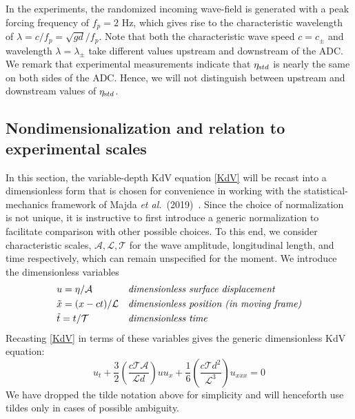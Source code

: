 \documentclass[11pt]{article}
\newcommand{\freqp}{f_p}
\newcommand{\etastd}{\eta_{\text std}}
\newcommand{\depth}{d}
\newcommand{\lam}{\lambda}
\newcommand{\lamupdn}{\lam_{\pm}}
\newcommand{\ampscale}{\mathcal{A}}
\newcommand{\lengthscale}{\mathcal{L}}
\newcommand{\timescale}{\mathcal{T}}
\newcommand{\maetal}{Majda {\it et al.}~(2019)~}
\begin{document}
In the experiments, the randomized incoming wave-field is generated with a peak forcing frequency of $\freqp = 2$ Hz, which gives rise to the characteristic wavelength of $\lam = c/\freqp = \sqrt{g \depth} / \freqp$. Note that both the characteristic wave speed $c = c_{\pm}$ and wavelength $\lam = \lamupdn$ take different values upstream and downstream of the ADC. We remark that experimental measurements indicate that $\etastd$ is nearly the same on both sides of the ADC. Hence, we will not distinguish between upstream and downstream values of $\etastd$.

 
\subsection{Nondimensionalization and relation to experimental scales}

In this section, the variable-depth KdV equation \eqref{KdV} will be recast into a dimensionless form that is chosen for convenience in working with the statistical-mechanics framework of \maetal \cite{majda2019}. Since the choice of normalization is not unique, it is instructive to first introduce a generic normalization to facilitate comparison with other possible choices. To this end, we consider characteristic scales, $\ampscale, \lengthscale, \timescale$ for the wave amplitude, longitudinal length, and time respectively, which can remain unspecified for the moment. We introduce the dimensionless variables
\begin{align}
&u = \eta / \ampscale
&&\mbox{\em dimensionless surface displacement} \\
&\tilde{x} = (x-ct) / \lengthscale
&&\mbox{\em dimensionless position (in moving frame)} \\
&\tilde{t} = t / \timescale
&&\mbox{\em dimensionless time}
\end{align}
Recasting \eqref{KdV} in terms of these variables gives the generic dimensionless KdV equation:
\begin{equation}
u_t + \frac{3}{2} \left( \frac{c \timescale \ampscale}{\lengthscale \depth} \right) u u_x 
+ \frac{1}{6} \left( \frac{c \timescale \depth^2}{\lengthscale^3} \right) u_{xxx} = 0
\end{equation}
We have dropped the tilde notation above for simplicity and will henceforth use tildes only in cases of possible ambiguity.
\end{document}
